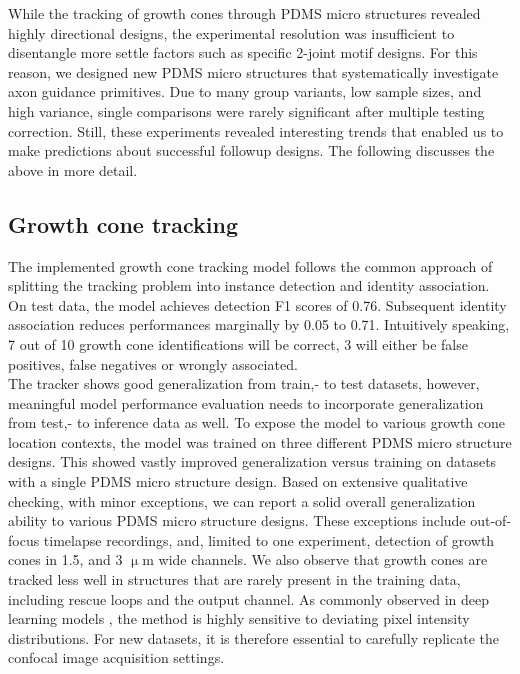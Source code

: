 While the tracking of growth cones through PDMS micro structures revealed highly
directional designs, the experimental resolution was insufficient to disentangle
more settle factors such as specific 2-joint motif designs. For this reason, we
designed new PDMS micro structures that systematically investigate axon guidance
primitives. Due to many group variants, low sample sizes, and high variance,
single comparisons were rarely significant after multiple testing correction.
Still, these experiments revealed interesting trends that enabled us to make
predictions about successful followup designs. The following discusses the above
in more detail.

\subsection{Growth cone tracking}
The implemented growth cone tracking model follows the common approach of
splitting the tracking problem into instance detection and identity association.
On test data, the model achieves detection F1 scores of 0.76. Subsequent
identity association reduces performances marginally by 0.05 to 0.71.
Intuitively speaking, 7 out of 10 growth cone identifications will be correct, 3
will either be false positives, false negatives or wrongly associated. \\

The tracker shows good generalization from train,- to test datasets, however,
meaningful model performance evaluation needs to incorporate generalization from
test,- to inference data as well. To expose the model to various growth cone
location contexts, the model was trained on three different PDMS micro structure
designs. This showed vastly improved generalization versus training on datasets
with a single PDMS micro structure design. Based on extensive qualitative
checking, with minor exceptions, we can report a solid overall generalization
ability to various PDMS micro structure designs. These exceptions include
out-of-focus timelapse recordings, and, limited to one experiment, detection of
growth cones in 1.5, and 3 $\upmu$m wide channels. We also observe that growth
cones are tracked less well in structures that are rarely present in the
training data, including rescue loops and the output channel. As commonly
observed in deep learning models \parencite{cnn_generalization}, the method is
highly sensitive to
deviating pixel intensity distributions. For new datasets, it is therefore
essential to carefully replicate the confocal image acquisition settings. \\

